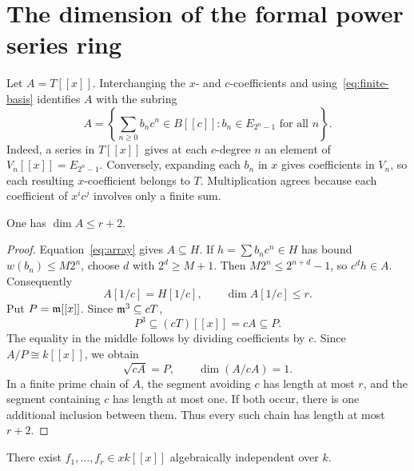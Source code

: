 \section{The dimension of the formal power series ring}
\label{sec:dimension}

Let $A=T[[x]]$. Interchanging the $x$- and $c$-coefficients and
using~\eqref{eq:finite-basis} identifies $A$ with the subring
\begin{equation}\label{eq:array}
 A=\left\{\sum_{n\ge0}b_nc^n\in B[[c]]:
                         b_n\in E_{2^n-1}\text{ for all }n\right\}.
\end{equation}
Indeed, a series in $T[[x]]$ gives at each $c$-degree $n$ an
element of $V_n[[x]]=E_{2^n-1}$. Conversely, expanding each $b_n$
in $x$ gives coefficients in $V_n$, so each resulting
$x$-coefficient belongs to $T$. Multiplication agrees because
each coefficient of $x^i c^j$ involves only a finite sum.

\begin{proposition}\label{prop:upper}
One has $\dim A\le r+2$.
\end{proposition}

\begin{proof}
Equation~\eqref{eq:array} gives $A\subseteq H$.
If $h=\sum b_nc^n\in H$ has bound $w(b_n)\le M2^n$, choose
$d$ with $2^d\ge M+1$. Then
$M2^n\le2^{n+d}-1$, so $c^dh\in A$. Consequently
\begin{equation}\label{eq:localization}
 A[1/c]=H[1/c],\qquad\dim A[1/c]\le r.
\end{equation}
Put $P=\mathfrak m[[x]]$. Since $\mathfrak m^3\subseteq cT$,
\[
 P^3\subseteq(cT)[[x]]=cA\subseteq P.
\]
The equality in the middle follows by dividing coefficients by
$c$. Since $A/P\cong k[[x]]$, we obtain
\begin{equation}\label{eq:closed-part}
 \sqrt{cA}=P,\qquad\dim(A/cA)=1.
\end{equation}
In a finite prime chain of $A$, the segment avoiding $c$ has
length at most $r$, and the segment containing $c$ has length at
most one. If both occur, there is one additional inclusion between
them. Thus every such chain has length at most $r+2$.
\end{proof}

\begin{lemma}\label{lem:exponentials}
There exist $f_1,\ldots,f_r\in xk[[x]]$ algebraically
independent over $k$.
\end{lemma}


